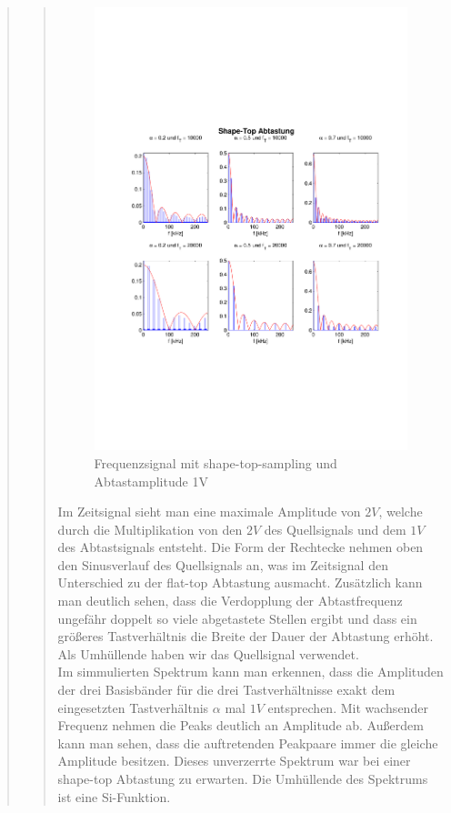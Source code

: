 \begin{quote}
\begin{quote}
  	    
  	    \begin{figure}[H]
    \centering
        \includegraphics[scale=0.7, trim = 0cm 0cm 0cm 0cm,
        clip]{./Bilder/shape-top-freq_1V}
            \caption{Frequenzsignal mit shape-top-sampling und Abtastamplitude
            1V}
  	    \end{figure}
  	    
  	    Im Zeitsignal sieht man eine maximale Amplitude von $2V$, welche durch
  	    die Multiplikation von den $2V$ des Quellsignals und dem $1V$ des
  	    Abtastsignals entsteht. Die Form der Rechtecke nehmen oben den
  	    Sinusverlauf des Quellsignals an, was im Zeitsignal den Unterschied zu
  	    der flat-top Abtastung ausmacht. Zusätzlich kann man deutlich sehen, dass
  	    die Verdopplung der Abtastfrequenz ungefähr doppelt so viele abgetastete Stellen ergibt und 
  	    dass ein größeres Tastverhältnis die Breite der Dauer der Abtastung erhöht. 
  	    Als Umhüllende haben wir das Quellsignal verwendet.\\
  	    Im simmulierten Spektrum kann man erkennen, dass die Amplituden der
  	    drei Basisbänder für die drei Tastverhältnisse exakt dem eingesetzten
  	    Tastverhältnis $\alpha$ mal $1V$ entsprechen. Mit wachsender Frequenz
  	    nehmen die Peaks deutlich an Amplitude ab. Außerdem kann man sehen, dass
  	    die auftretenden Peakpaare immer die gleiche Amplitude besitzen. Dieses
  	    unverzerrte Spektrum war bei einer shape-top Abtastung zu erwarten.
  	    Die Umhüllende des Spektrums ist eine Si-Funktion.
  	    

\end{quote}
\end{quote}
